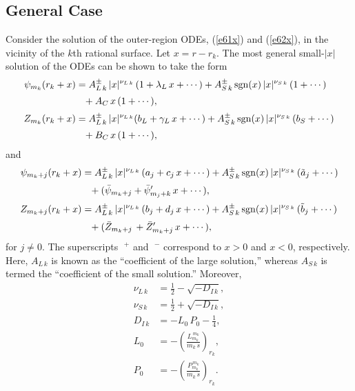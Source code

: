 \documentclass[12pt,prb,aps]{revtex4-1}
\begin{document}
\subsection{General Case}\label{sgen}
Consider the solution of the outer-region ODEs, (\ref{e61x}) and (\ref{e62x}), in the
vicinity of the $k$th rational surface. Let  $x=r-r_k$.  The most general small-$|x|$ solution of the ODEs
can be shown to take the form\,\cite{am1,am3}
\begin{align}
\psi_{m_k}(r_k+x)&=A_{L\,k}^\pm \,|x|^{\nu_{L\,k}}\,(1+\lambda_{L}\,x+\cdots) + A_{S\,k}^{\pm}\,{\rm sgn}(x)\,|x|^{\nu_{S\,k}}\,(1+\cdots) \nonumber\\[0.5ex]
& \phantom{=}+ A_{C}\,x\,(1+\cdots),\label{ex1}\\[0.5ex]
Z_{m_k}(r_k+x)&= A_{L\,k}^\pm\,|x|^{\nu_{L\,k}}(b_{L}  + \gamma_{L}\,x+\cdots) + A_{S\,k}^{\pm}\,{\rm sgn}(x)\,|x|^{\nu_{S\,k}}\,(b_{S}+\cdots)\nonumber\\[0.5ex]
& \phantom{=}+ B_{C}\,x\,(1+\cdots),\label{ex2}
\end{align}
and 
\begin{align}
\psi_{m_k+j}(r_k+x)&=A_{L\,k}^\pm\,|x|^{\nu_{L\,k}}\,(a_j+c_j\,x+\cdots)  
+A_{S\,k}^\pm\,{\rm sgn}(x)\,|x|^{\nu_{S\,k}}\,(\tilde{a}_{j}+\cdots)\nonumber\\[0.5ex]
&\phantom{=}+ (\bar{\psi}_{m_k+j}+\bar{\psi}_{m_j+k}'\,x+\cdots),\\[0.5ex]
Z_{m_k+j}(r_k+x)&= A_{L\,k}^\pm\,|x|^{\nu_{L\,k}}\,(b_j+d_j\,x+\cdots) +A_{S\,k}^\pm\,{\rm sgn}(x)\,|x|^{\nu_{S\,k}}\,(\tilde{b}_{j}+\cdots)\nonumber\\[0.5ex]
&\phantom{=}+(\bar{Z}_{m_k+j}\,+\bar{Z}_{m_k+j}'\,x+\cdots),\label{ex4}
\end{align}
for $j\neq 0$. 
The superscripts $\phantom{!}^+$ and $\phantom{!}^-$ correspond  to $x>0$ and $x<0$, respectively. Here, $A_{L\,k}$ is known as the ``coefficient of
the large solution,'' whereas $A_{S\,k}$ is termed the ``coefficient of the small solution.''\cite{am1,am3,ggj}
Moreover, 
\begin{align}
\nu_{L\,k}&= \frac{1}{2}-\sqrt{-D_{I\,k}},\label{nul}\\[0.5ex]
\nu_{S\,k} &=  \frac{1}{2}+\sqrt{-D_{I\,k}},\label{nus}\\[0.5ex]
D_{I\,k} &= -L_0\,P_0-\frac{1}{4},\\[0.5ex]
L_0 &=-\left(\frac{L_{m_k}^{\,m_k}}{m_k\,s}\right)_{r_k},\label{lkk}\\[0.5ex]
P_0 &= -\left(\frac{P_{m_k}^{\,m_k}}{m_k\,s}\right)_{r_k}.\label{pkk}
\end{align}
\end{document}
